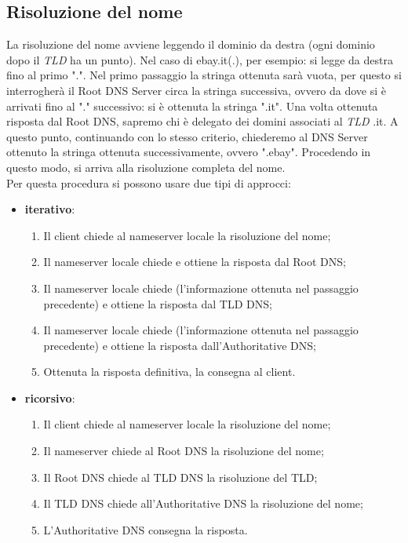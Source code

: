 \subsection{Risoluzione del nome}
La risoluzione del nome avviene leggendo il dominio da destra (ogni dominio dopo il \textit{TLD} ha un punto). Nel caso di ebay.it(.), per esempio: si legge da destra fino al primo ".". Nel primo passaggio la stringa ottenuta sarà vuota, per questo si interrogherà il Root DNS Server circa la stringa successiva, ovvero da dove si è arrivati fino al "." successivo: si è ottenuta la stringa ".it". Una volta ottenuta risposta dal Root DNS, sapremo chi è delegato dei domini associati al \textit{TLD} .it. A questo punto, continuando con lo stesso criterio, chiederemo al DNS Server ottenuto la stringa ottenuta successivamente, ovvero ".ebay". Procedendo in questo modo, si arriva alla risoluzione completa del nome. \\
Per questa procedura si possono usare due tipi di approcci:
\begin{itemize}
    \item \textbf{iterativo}:
    \begin{enumerate}
    	\item Il client chiede al nameserver locale la risoluzione del nome;
    	\item Il nameserver locale chiede e ottiene la risposta dal Root DNS;
    	\item Il nameserver locale chiede (l'informazione ottenuta nel passaggio precedente) e ottiene la risposta dal TLD DNS;
    	\item Il nameserver locale chiede (l'informazione ottenuta nel passaggio precedente) e ottiene la risposta dall'Authoritative DNS;
    	\item Ottenuta la risposta definitiva, la consegna al client.
    \end{enumerate}
    \item \textbf{ricorsivo}:
    \begin{enumerate}
    	\item Il client chiede al nameserver locale la risoluzione del nome;
    	\item Il nameserver chiede al Root DNS la risoluzione del nome;
    	\item Il Root DNS chiede al TLD DNS la risoluzione del TLD;
    	\item Il TLD DNS chiede all'Authoritative DNS la risoluzione del nome;
    	\item L'Authoritative DNS consegna la risposta.
    \end{enumerate}
\end{itemize}

